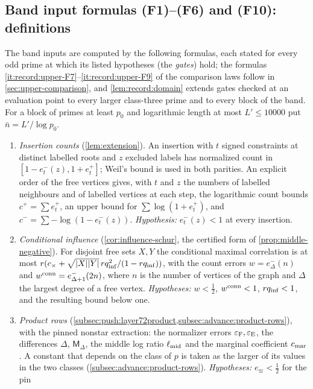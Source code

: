 \subsection{Band input formulas (F1)--(F6) and (F10): definitions}\label{subsec:upper-formulas}

The band inputs are computed by the following formulas, each stated for every odd
prime at which its listed hypotheses (the \emph{gates}) hold; the formulas
\ref{it:record:upper-F7}--\ref{it:record:upper-F9} of the comparison laws follow in
\cref{sec:upper-comparison}, and \cref{lem:record:domain} extends gates checked at an
evaluation point to every larger class-three prime and to every block of the band. For
a block of primes at least $p_0$ and logarithmic length at most $L'\le10000$ put
$\bar n=L'/\log p_0$.
\begin{enumerate}[label=\textup{(F\arabic*)}]
\item\label{it:record:upper-F1} \emph{Insertion counts} (\cref{lem:extension}). An
 insertion with $t$ signed constraints at distinct labelled roots and $z$ excluded
 labels has normalized count in $[1-e^-_t(z),1+e^+_t]$; Weil's bound is used in both
 parities. An explicit order of the free vertices gives, with $t$ and $z$ the numbers of
 labelled neighbours and of labelled vertices at each step, the logarithmic count
 bounds $c^+=\sum e^+_t$, an upper bound for $\sum\log(1+e^+_t)$, and
 $c^-=\sum-\log(1-e^-_t(z))$. \emph{Hypothesis:} $e^-_t(z)<1$ at every insertion.
\item\label{it:record:upper-F2} \emph{Conditional influence}
 (\cref{cor:influence-schur}, the certified form of \cref{prop:middle-negative}). For
 disjoint free sets $X,Y$ the conditional maximal correlation is at most
 $r(c_\times+\sqrt{|X||Y|}\,rq_{\rm inf}^2/(1-rq_{\rm inf}))$, with the count errors
 $w=e^-_\Delta(n)$ and $w^{\rm conn}=e^-_{\Delta+1}(2n)$, where $n$ is the number of
 vertices of the graph and $\Delta$ the largest degree of a free vertex. \emph{Hypotheses:}
 $w<\frac12$, $w^{\rm conn}<1$, $rq_{\rm inf}<1$, and the resulting bound below one.
\item\label{it:record:upper-F3} \emph{Product rows} (\cref{subsec:push:layer72product,subsec:advance:product-rows}),
 with the pinned nonstar extraction: the normalizer errors $\varepsilon_{\rm F},\varepsilon_{\rm E}$,
 the differences $\Delta$, $\mathsf M_\Delta$, the middle log ratio $\ell_{\rm mid}$ and
 the marginal coefficient $c_{\rm mar}$. A constant that depends on the class of $p$
 is taken as the larger of its values in the two classes
 (\cref{subsec:advance:product-rows}). \emph{Hypotheses:} $e_\varpi<\frac12$ for the pin

\end{enumerate}

